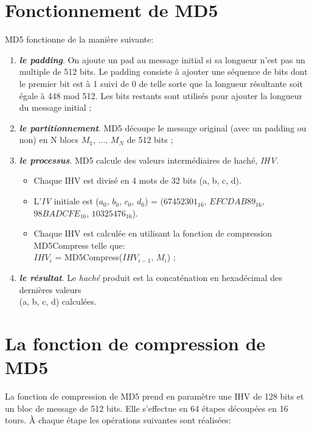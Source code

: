 \section{Fonctionnement de MD5}
MD5 fonctionne de la manière suivante:\\
\begin{enumerate}
\item {\it{\bf{le padding}}}. On ajoute un pad au message initial si sa longueur n'est pas un multiple de 512 bits. Le padding consiste à ajouter une séquence de bits dont le premier bit est à 1 suivi de 0 de telle sorte que la longueur résultante soit égale à 448 mod 512. Les bits restants sont utilisés pour ajouter la longueur du message initial ;
\item {\it{\bf{le partitionnement}}}. MD5 découpe le message original (avec un padding ou non) en N blocs $M_{1}$, ..., $M_{N}$ de 512 bits ;
\item {\it{\bf{le processus}}}. MD5 calcule des valeurs intermédiaires de haché, {\it{IHV}}.
  \begin{itemize}
  \item Chaque IHV est divisé en 4 mots de 32 bits (a, b, c, d).
  \item L'{\it{IV}} initiale est ($a_{0}$, $b_{0}$, $c_{0}$, $d_{0}$) = ($67452301_{16}$, $EFCDAB89_{16}$, $98BADCFE_{16}$, $10325476_{16}$).
  \item Chaque IHV est calculée en utilisant la fonction de compression MD5Compress telle que:\\ $IHV_{i}$ = MD5Compress($IHV_{i-1}$, $M_{i}$) ;
  \end{itemize}
\item {\it{\bf{le résultat}}}. Le {\it{haché}} produit est la concaténation en hexadécimal des dernières valeurs\\ (a, b, c, d) calculées.
\end{enumerate}

\section{La fonction de compression de MD5}
La fonction de compression de MD5 prend en paramètre une IHV de 128 bits et un bloc de message de 512 bits. Elle s'effectue en 64 étapes découpées en 16 tours. À chaque étape les opérations suivantes sont réalisées:\\

